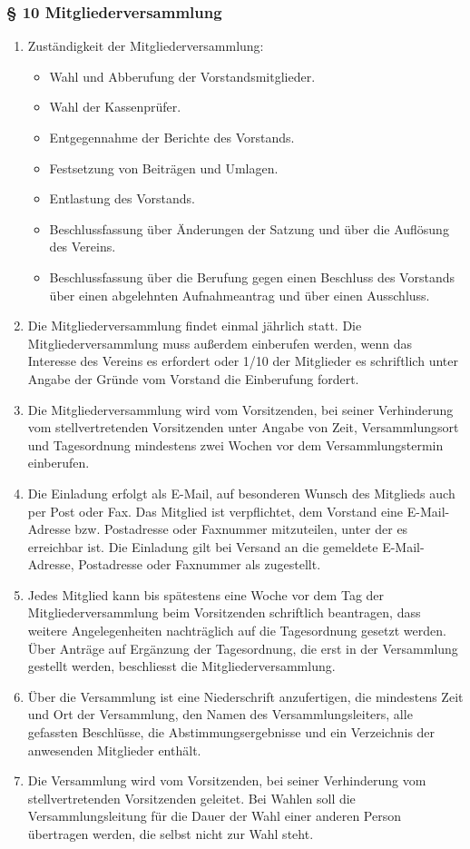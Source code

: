 \documentclass[a4paper,10pt]{article}
\begin{document}
\subsubsection*{§ 10 Mitgliederversammlung}
\begin{enumerate}
  \item Zuständigkeit der Mitgliederversammlung:
    \begin{itemize}
      \item Wahl und Abberufung der Vorstandsmitglieder.
      \item Wahl der Kassenprüfer.
      \item Entgegennahme der Berichte des Vorstands.
      \item Festsetzung von Beiträgen und Umlagen.
      \item Entlastung des Vorstands.
      \item Beschlussfassung über Änderungen der Satzung und über die Auflösung des Vereins.
      \item Beschlussfassung über die Berufung gegen einen Beschluss des Vorstands über
einen abgelehnten Aufnahmeantrag und über einen Ausschluss.
\end{itemize}
\item Die Mitgliederversammlung findet einmal jährlich statt. Die
Mitgliederversammlung muss außerdem einberufen werden, wenn das Interesse des
Vereins es erfordert oder 1/10 der Mitglieder es schriftlich unter Angabe der
Gründe vom Vorstand die Einberufung fordert.
\item Die Mitgliederversammlung wird vom Vorsitzenden, bei seiner Verhinderung vom
stellvertretenden Vorsitzenden unter Angabe von Zeit, Versammlungsort und
Tagesordnung mindestens zwei Wochen vor dem Versammlungstermin einberufen.
\item Die Einladung erfolgt als E-Mail, auf besonderen Wunsch des Mitglieds auch per
Post oder Fax. Das Mitglied ist verpflichtet, dem Vorstand eine E-Mail-Adresse
bzw. Postadresse oder Faxnummer mitzuteilen, unter der es erreichbar ist. Die
Einladung gilt bei Versand an die gemeldete E-Mail-Adresse, Postadresse oder
Faxnummer als zugestellt.
\item Jedes Mitglied kann bis spätestens eine Woche vor dem Tag der
Mitgliederversammlung beim Vorsitzenden schriftlich beantragen, dass weitere
Angelegenheiten nachträglich auf die Tagesordnung gesetzt werden. Über Anträge
auf Ergänzung der Tagesordnung, die erst in der Versammlung gestellt werden,
beschliesst die Mitgliederversammlung.
\item Über die Versammlung ist eine Niederschrift anzufertigen, die mindestens Zeit
und Ort der Versammlung, den Namen des Versammlungsleiters, alle gefassten
Beschlüsse, die Abstimmungsergebnisse und ein Verzeichnis der anwesenden
Mitglieder enthält.
\item Die Versammlung wird vom Vorsitzenden, bei seiner Verhinderung vom
stellvertretenden Vorsitzenden geleitet. Bei Wahlen soll die Versammlungsleitung
für die Dauer der Wahl einer anderen Person übertragen werden, die selbst nicht
zur Wahl steht.
\end{enumerate}
\end{document}
